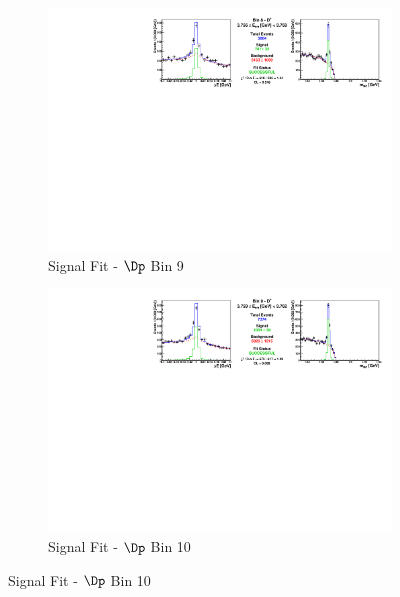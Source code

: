 \begin{figure}[h]

\begin{subfigure}[c]{0.99\textwidth}
\includegraphics[width=\textwidth]{figures/plots/fit_results/Dp_bin_08.pdf}
\caption*{Signal Fit - $\Dp$ Bin 9}
\end{subfigure}

\vspace{5pt}

\begin{subfigure}[c]{0.99\textwidth}
\includegraphics[width=\textwidth]{figures/plots/fit_results/Dp_bin_09.pdf}
\caption*{Signal Fit - $\Dp$ Bin 10}
\end{subfigure}

\vspace{5pt}


\end{figure}
